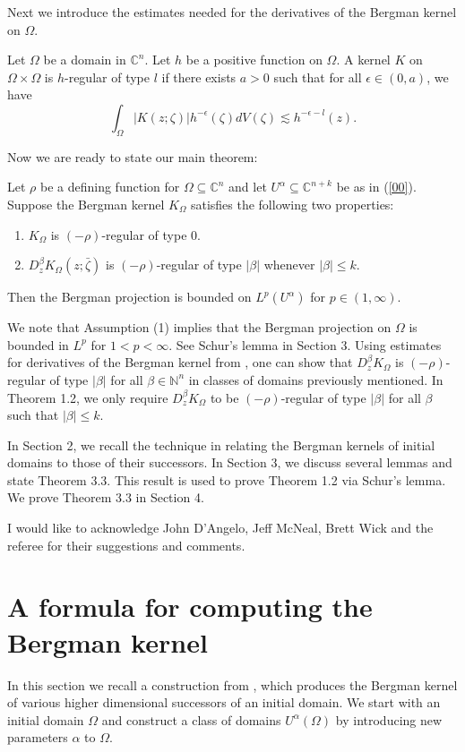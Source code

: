 \documentclass[reqno,12pt]{amsart}
\numberwithin{equation}{section}
\begin{document}
 {Next we introduce the estimates needed for the derivatives of the Bergman kernel on $\Omega$.}
\begin{de}
Let $\Omega$ be a domain in $\mathbb C^n$. Let $h$ be a positive function on $\Omega$. A kernel $K$ on $\Omega\times\Omega$ is $h$-regular of type $l$ if there exists $a>0$ such that for all $\epsilon\in (0,a)$, we have
\begin{equation}\label{71}
\int_{\Omega}\left|K(z ;\zeta )\right|h^{-\epsilon}(\zeta)dV(\zeta )\lesssim h^{-\epsilon-l}{(z)}.
\end{equation}
\end{de}
Now we are ready to state our main theorem:
\begin{thm}
Let $\rho$ be a defining function for $\Omega\subseteq \mathbb C^n$ and let $U^{\alpha}\mathbb\subseteq \mathbb C^{n+k} $ be as in (\ref{00}). Suppose the Bergman kernel $K_{\Omega}$ satisfies the following two properties:
	\begin{enumerate}
		\item $K_{\Omega}$ is $(-\rho)$-regular of type $0$.
		\item $D^{\beta}_zK_{\Omega}(z;\bar{\zeta})$ is $(-\rho)$-regular of type $|\beta|$ whenever $|\beta|\leq k$.
	\end{enumerate}
	Then the Bergman projection is bounded on $L^p(U^{\alpha})$ for $p\in (1,\infty)$.
\end{thm}
We note that Assumption (1) implies that the Bergman projection on $\Omega$ is bounded in $L^p$ for $1<p<\infty$. See Schur's lemma in Section 3. Using estimates for derivatives of the Bergman kernel from \cite{McNeal2,McNeal1,NRSW,PS,CD}, one can show that $D^{\beta}_zK_{\Omega}$ is $(-\rho)$-regular of type $|\beta|$ for all $\beta\in \mathbb N^n$ in {classes of domains} previously mentioned.
In Theorem 1.2, we only require $D^{\beta}_zK_{\Omega}$ to be $(-\rho)$-regular of type $|\beta|$ for all $\beta$ such that $|\beta|\leq k$.

In Section 2, we recall the technique in \cite{Zhenghui} {relating the Bergman kernels of initial domains to those of their successors}. In Section 3, we discuss several lemmas and state Theorem 3.3. {This result is used to prove Theorem 1.2 via Schur's lemma}. We prove Theorem 3.3 in Section 4.

I would like to acknowledge John D'Angelo, Jeff McNeal, Brett Wick and the referee for their suggestions and comments.
\section{A formula for computing the Bergman kernel}
In this section we recall {a construction} from \cite{Zhenghui}{, which produces the Bergman kernel of various higher dimensional successors of an initial domain}. We start with an initial domain $\Omega$ and construct a class of domains  $U^{\alpha}(\Omega)$ by introducing new parameters $\alpha$ to $\Omega$. 
\end{document}
